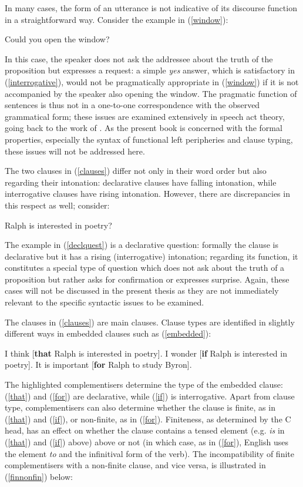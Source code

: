 In many cases, the form of an utterance is not indicative of its discourse function in a straightforward way. Consider the example in (\ref{window}):

\ea Could you open the window? \label{window}
\z

In this case, the speaker does not ask the addressee about the truth of the proposition but expresses a request: a simple \textit{yes} answer, which is satisfactory in (\ref{interrogative}), would not be pragmatically appropriate in (\ref{window}) if it is not accompanied by the speaker also opening the window. The pragmatic function of sentences is thus not in a one-to-one correspondence with the observed grammatical form; these issues are examined extensively in speech act theory, going back to the work of \citet{austin1962}. As the present book is concerned with the formal properties, especially the syntax of functional left peripheries and clause typing, these issues will not be addressed here.  

The two clauses in (\ref{clauses}) differ not only in their word order but also regarding their intonation: declarative clauses have falling intonation, while interrogative clauses have rising intonation. However, there are discrepancies in this respect as well; consider:

\ea Ralph is interested in poetry? \label{declquest}
\z

The example in (\ref{declquest}) is a declarative question: formally the clause is declarative but it has a rising (interrogative) intonation; regarding its function, it constitutes a special type of question which does not ask about the truth of a proposition but rather asks for confirmation or expresses surprise. Again, these cases will not be discussed in the present thesis as they are not immediately relevant to the specific syntactic issues to be examined.

The clauses in (\ref{clauses}) are main clauses. Clause types are identified in slightly different ways in embedded clauses such as (\ref{embedded}):

\ea \label{embedded}
\ea I think [\textbf{that} Ralph is interested in poetry]. \label{that}
\ex I wonder [\textbf{if} Ralph is interested in poetry]. \label{if}
\ex It is important [\textbf{for} Ralph to study Byron]. \label{for}
\z
\z

The highlighted complementisers determine the type of the embedded clause: (\ref{that}) and (\ref{for}) are declarative, while (\ref{if}) is interrogative. Apart from clause type, complementisers can also determine whether the clause is finite, as in (\ref{that}) and (\ref{if}), or non-finite, as in (\ref{for}). Finiteness, as determined by the C head, has an effect on whether the clause contains a tensed element (e.g. \textit{is} in (\ref{that}) and (\ref{if}) above) above or not (in which case, as in (\ref{for}), English uses the element \textit{to} and the infinitival form of the verb). The incompatibility of finite complementisers with a non-finite clause, and vice versa, is illustrated in (\ref{finnonfin}) below:


